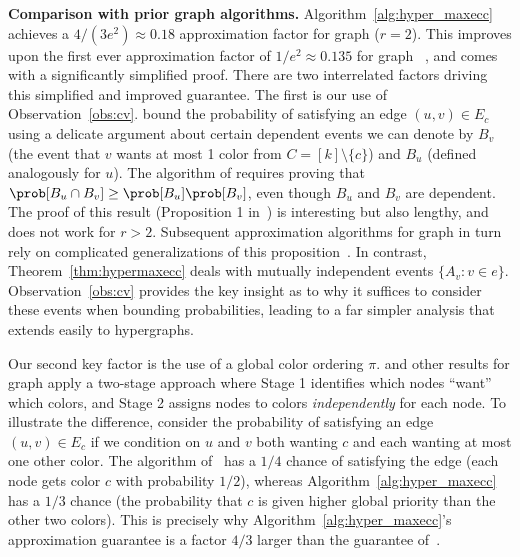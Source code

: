 \textbf{Comparison with prior graph \maxecc{} algorithms.}
Algorithm~\ref{alg:hyper_maxecc} achieves a ${4}/({3e^2}) \approx 0.18$ approximation factor for graph \maxecc{} ($r = 2$). This improves upon the first ever approximation factor of $1/e^2 \approx 0.135$ for graph \maxecc{}~\cite{angel2016clustering}, and comes with a significantly simplified proof. There are two interrelated factors driving this simplified and improved guarantee.
The first is our use of Observation~\ref{obs:cv}.
\citet{angel2016clustering} bound the probability of satisfying an edge $(u,v) \in E_c$ using a delicate argument about certain dependent events we can denote by $B_v$ (the event that $v$ wants at most 1 color from $C = [k]\setminus \{c\}$) and $B_u$ (defined analogously for $u$).
The algorithm of \citet{angel2016clustering} requires proving that $\prob[B_{u} \cap B_v] \geq \prob[B_{u}] \prob[B_v]$, even though $B_u$ and $B_v$ are dependent. The proof of this result (Proposition 1 in~\citet{angel2016clustering}) is interesting but also lengthy, and does not work for $r > 2$. Subsequent approximation algorithms for graph \maxecc{} in turn rely on complicated generalizations of this proposition~\cite{ageev2015improved,ageev20200,alhamdan2019approximability}. In contrast, Theorem~\ref{thm:hypermaxecc} deals with mutually independent events $\{A_v \colon v \in e\}$. Observation~\ref{obs:cv} provides the key insight as to why it suffices to consider these events when bounding probabilities, leading to a far simpler analysis that extends easily to hypergraphs.

Our second key factor is the use of a global color ordering $\pi$. \citet{angel2016clustering} and other results for graph \maxecc{} apply a two-stage approach where Stage 1 identifies which nodes ``want'' which colors, and Stage 2 assigns nodes to colors \emph{independently} for each node. To illustrate the difference, consider the probability of satisfying an edge $(u,v) \in E_c$ if we condition on $u$ and $v$ both wanting $c$ and each wanting at most one other color. The algorithm of~\citet{angel2016clustering} has a $1/4$ chance of satisfying the edge (each node gets color $c$ with probability $1/2$), whereas Algorithm~\ref{alg:hyper_maxecc} has a $1/3$ chance (the probability that $c$ is given higher global priority than the other two colors). This is precisely why Algorithm~\ref{alg:hyper_maxecc}'s approximation guarantee is a factor $4/3$ larger than the guarantee of~\citet{angel2016clustering}.


